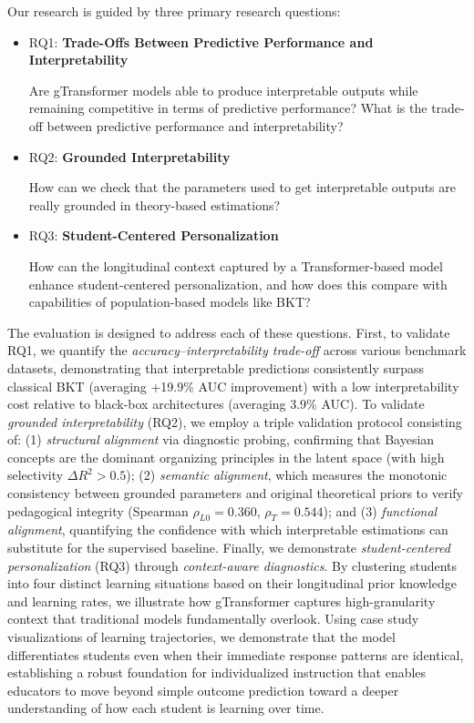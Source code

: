 \documentclass[applsci,article,submit,moreauthors,pdftex]{Definitions/mdpi}
\begin{document}
Our research is guided by three primary research questions:

\begin{itemize}
\item RQ1: \textbf{Trade-Offs Between Predictive Performance and Interpretability}

Are gTransformer models able to produce interpretable outputs while remaining competitive in terms of predictive performance? What is the trade-off between predictive performance  and interpretability?

\item RQ2: \textbf{Grounded Interpretability}

How can we check that the parameters used to get interpretable outputs are really grounded in theory-based estimations?  

\item RQ3: \textbf{Student-Centered Personalization}

How can the longitudinal context captured by a Transformer-based model enhance student-centered personalization, and how does this compare with capabilities of population-based models like BKT?

\end{itemize} \label{sec_rq}

The evaluation is designed to address each of these questions. First, to validate RQ1, we quantify the \textit{accuracy--interpretability trade-off} across various benchmark datasets, demonstrating that interpretable predictions consistently surpass classical BKT (averaging +19.9\% AUC improvement) with a low interpretability cost relative to black-box architectures (averaging 3.9\% AUC). To validate \textit{grounded interpretability} (RQ2), we employ a triple validation protocol consisting of: (1) \textit{structural alignment} via diagnostic probing, confirming that Bayesian concepts are the dominant organizing principles in the latent space (with high selectivity $\Delta R^2 > 0.5$); (2) \textit{semantic alignment}, which measures the monotonic consistency between grounded parameters and original theoretical priors to verify pedagogical integrity (Spearman $\rho_{L0}=0.360$, $\rho_T=0.544$); and (3) \textit{functional alignment}, quantifying the confidence with which interpretable estimations can substitute for the supervised baseline. Finally, we demonstrate \textit{student-centered personalization} (RQ3) through \textit{context-aware diagnostics}. By clustering students into four distinct learning situations based on their longitudinal prior knowledge and learning rates, we illustrate how gTransformer captures high-granularity context that traditional models fundamentally overlook. Using case study visualizations of learning trajectories, we demonstrate that the model differentiates students even when their immediate response patterns are identical, establishing a robust foundation for individualized instruction that enables educators to move beyond simple outcome prediction toward a deeper understanding of how each student is learning over time.
\end{document}
